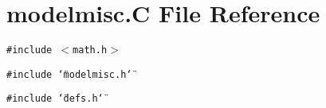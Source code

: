 \section{modelmisc.C File Reference}
\label{modelmisc_8C}
{\tt \#include $<$math.h$>$}\par
{\tt \#include \char`\"{}modelmisc.h\char`\"{}}\par
{\tt \#include \char`\"{}defs.h\char`\"{}}\par
